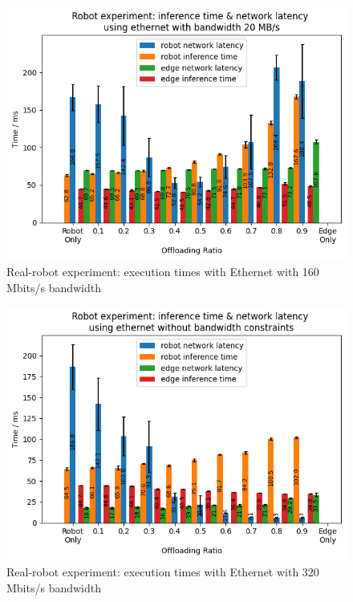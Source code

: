 \begin{figure}
    \centering
    \includegraphics[width=\linewidth]{figures/experiment/real_robot/eth/execution_time_160.png}
    \caption{Real-robot experiment: execution times with Ethernet with 160 Mbits/s bandwidth}
    \label{fig:real_robot_experiment:eth_execution_time_160}
\end{figure}

\begin{figure}
    \centering
    \includegraphics[width=\linewidth]{figures/experiment/real_robot/eth/execution_time_320.png}
    \caption{Real-robot experiment: execution times with Ethernet with 320 Mbits/s bandwidth}
    \label{fig:real_robot_experiment:eth_execution_time_320}
\end{figure}

